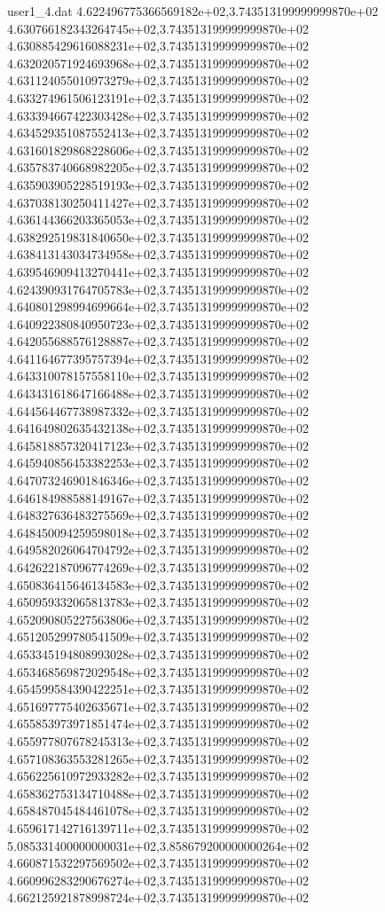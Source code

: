 \begin{filecontents}{user1_4.dat}
4.622496775366569182e+02,3.743513199999999870e+02
4.630766182343264745e+02,3.743513199999999870e+02
4.630885429616088231e+02,3.743513199999999870e+02
4.632020571924693968e+02,3.743513199999999870e+02
4.631124055010973279e+02,3.743513199999999870e+02
4.633274961506123191e+02,3.743513199999999870e+02
4.633394667422303428e+02,3.743513199999999870e+02
4.634529351087552413e+02,3.743513199999999870e+02
4.631601829868228606e+02,3.743513199999999870e+02
4.635783740668982205e+02,3.743513199999999870e+02
4.635903905228519193e+02,3.743513199999999870e+02
4.637038130250411427e+02,3.743513199999999870e+02
4.636144366203365053e+02,3.743513199999999870e+02
4.638292519831840650e+02,3.743513199999999870e+02
4.638413143034734958e+02,3.743513199999999870e+02
4.639546909413270441e+02,3.743513199999999870e+02
4.624390931764705783e+02,3.743513199999999870e+02
4.640801298994699664e+02,3.743513199999999870e+02
4.640922380840950723e+02,3.743513199999999870e+02
4.642055688576128887e+02,3.743513199999999870e+02
4.641164677395757394e+02,3.743513199999999870e+02
4.643310078157558110e+02,3.743513199999999870e+02
4.643431618647166488e+02,3.743513199999999870e+02
4.644564467738987332e+02,3.743513199999999870e+02
4.641649802635432138e+02,3.743513199999999870e+02
4.645818857320417123e+02,3.743513199999999870e+02
4.645940856453382253e+02,3.743513199999999870e+02
4.647073246901846346e+02,3.743513199999999870e+02
4.646184988588149167e+02,3.743513199999999870e+02
4.648327636483275569e+02,3.743513199999999870e+02
4.648450094259598018e+02,3.743513199999999870e+02
4.649582026064704792e+02,3.743513199999999870e+02
4.642622187096774269e+02,3.743513199999999870e+02
4.650836415646134583e+02,3.743513199999999870e+02
4.650959332065813783e+02,3.743513199999999870e+02
4.652090805227563806e+02,3.743513199999999870e+02
4.651205299780541509e+02,3.743513199999999870e+02
4.653345194808993028e+02,3.743513199999999870e+02
4.653468569872029548e+02,3.743513199999999870e+02
4.654599584390422251e+02,3.743513199999999870e+02
4.651697775402635671e+02,3.743513199999999870e+02
4.655853973971851474e+02,3.743513199999999870e+02
4.655977807678245313e+02,3.743513199999999870e+02
4.657108363553281265e+02,3.743513199999999870e+02
4.656225610972933282e+02,3.743513199999999870e+02
4.658362753134710488e+02,3.743513199999999870e+02
4.658487045484461078e+02,3.743513199999999870e+02
4.659617142716139711e+02,3.743513199999999870e+02
5.085331400000000031e+02,3.858679200000000264e+02
4.660871532297569502e+02,3.743513199999999870e+02
4.660996283290676274e+02,3.743513199999999870e+02
4.662125921878998724e+02,3.743513199999999870e+02

\end{filecontents}
